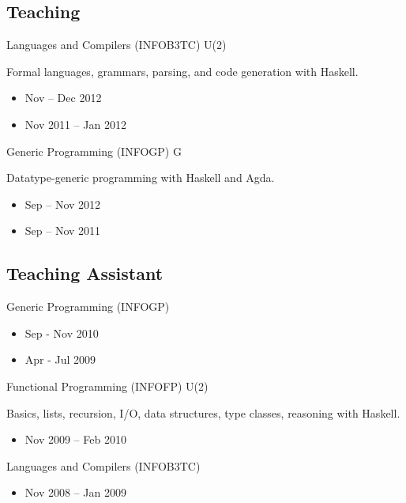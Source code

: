 \documentclass[11pt,a4paper,roman]{moderncv}
\begin{document}

\subsection{Teaching}

\cvlistitem{\coursenote}

\cventry%
{}%
{Languages and Compilers (INFOB3TC)}%
{\uu}%
{}%
{U(2)}%
{Formal languages, grammars, parsing, and code generation with Haskell.
\begin{itemize}
\item Nov -- Dec 2012
\item Nov 2011 -- Jan 2012
\end{itemize}}

\cventry%
{}%
{Generic Programming (INFOGP)}%
{\uu}%
{}%
{G}%
{Datatype-generic programming with Haskell and Agda.
\begin{itemize}
\item Sep -- Nov 2012
\item Sep -- Nov 2011
\end{itemize}}


\subsection{Teaching Assistant}

\cvlistitem{\coursenote}

\cventry%
{}%
{Generic Programming (INFOGP)}%
{\uu}%
{}%
{}%
{\begin{itemize}
\item Sep - Nov 2010
\item Apr - Jul 2009
\end{itemize}}

\cventry%
{}%
{Functional Programming (INFOFP)}%
{\uu}%
{}%
{U(2)}%
{Basics, lists, recursion, I/O, data structures, type classes, reasoning with Haskell.
\begin{itemize}
\item Nov 2009 -- Feb 2010
\end{itemize}}

\cventry%
{}%
{Languages and Compilers (INFOB3TC)}%
{\uu}%
{}%
{}%
{\begin{itemize}
\item Nov 2008 -- Jan 2009
\end{itemize}}
\end{document}
